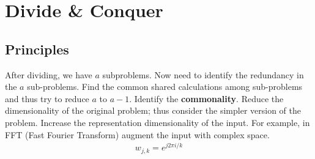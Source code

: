 \chapter{Divide \& Conquer}

\section{Principles}
 After dividing, we have $a$ subproblems. Now need to identify the redundancy in the $a$ sub-problems. Find the common shared calculations among sub-problems and thus try to reduce $a$ to $a-1$. Identify the \textbf{commonality}.
 Reduce the dimensionality of the original problem; thus consider the simpler version of the problem.
  Increase the representation dimensionality of the input. For example, in FFT (Fast Fourier Transform) augment the input with complex space. 
\begin{align*}
w_{j, k} = e^{j2\pi i/k}
\end{align*}
